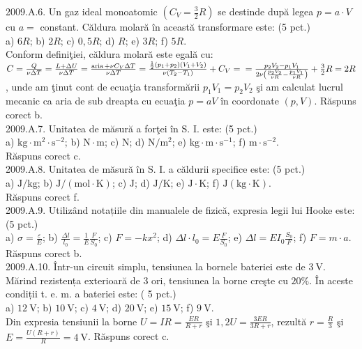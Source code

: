 2009.A.6. Un gaz ideal monoatomic $\left(C_{V}=\frac{3}{2} R\right)$ se destinde după legea $p=a \cdot V$ cu $a=$ constant. Căldura molară în această transformare este: (5 pct.)\\ a) $6 R$; b) $2 R$; c) $0,5 R$; d) $R$; e) $3 R$; f) $5 R$.\\ Conform definiţiei, căldura molară este egală cu:\\ $C=\frac{Q}{\nu \Delta T}=\frac{L+\Delta U}{\nu \Delta T}=\frac{\operatorname{aria}+\nu C_{V} \Delta T}{\nu \Delta T}=\frac{\frac{1}{2}\left(p_{1}+p_{2}\right)\left(V_{1}+V_{2}\right)}{\nu\left(T_{2}-T_{1}\right)}+C_{V}= \\ =\frac{p_{2} V_{2}-p_{1} V_{1}}{2 \nu\left(\frac{p_{2} V_{2}}{\nu R}-\frac{p_{1} V_{1}}{\nu R}\right)}+\frac{3}{2} R=2 R$, unde am ţinut cont de ecuaţia transformării $p_{1} V_{1}=p_{2} V_{2}$ şi am calculat lucrul mecanic ca aria de sub dreapta cu ecuaţia $p=a V$ în coordonate $(p, V)$. Răspuns corect b.\\

2009.A.7. Unitatea de măsură a forţei în S. I. este: (5 pct.)\\ a) $\mathrm{kg} \cdot \mathrm{m}^{2} \cdot \mathrm{s}^{-2}$; b) $\mathrm{N} \cdot \mathrm{m}$; c) $\mathrm{N}$; d) $\mathrm{N} / \mathrm{m}^{2}$; e) $\mathrm{kg} \cdot \mathrm{m} \cdot \mathrm{s}^{-1}$; f) $\mathrm{m} \cdot \mathrm{s}^{-2}$.\\ Răspuns corect c.\\

2009.A.8. Unitatea de măsură în S. I. a căldurii specifice este: (5 pct.)\\ a) $\mathrm{J} / \mathrm{kg}$; b) $\mathrm{J} /(\mathrm{mol} \cdot \mathrm{K})$; c) $\mathrm{J}$; d) $\mathrm{J} / \mathrm{K}$; e) $\mathrm{J} \cdot \mathrm{K}$; f) $\mathrm{J}(\mathrm{kg} \cdot \mathrm{K})$.\\ Răspuns corect f.\\

2009.A.9. Utilizând notațiile din manualele de fizică, expresia legii lui Hooke este: (5 pct.)\\ a) $\sigma=\frac{\varepsilon}{E}$; b) $\frac{\Delta l}{l_{0}}=\frac{1}{E} \frac{F}{S_{0}}$; c) $F=-k x^{2}$; d) $\Delta l \cdot l_{0}=E \frac{F}{S_{0}}$; e) $\Delta l=E I_{0} \frac{S_{0}}{F}$; f) $F=m \cdot a$. Răspuns corect b.\\

2009.A.10. Într-un circuit simplu, tensiunea la bornele bateriei este de $3 \mathrm{~V}$. Mărind rezistența exterioară de 3 ori, tensiunea la borne creşte cu $20 \%$. În aceste condiții t. e. m. a bateriei este: ( 5 pct.)\\ a) $12 \mathrm{~V}$; b) $10 \mathrm{~V}$; c) $4 \mathrm{~V}$; d) $20 \mathrm{~V}$; e) $15 \mathrm{~V}$; f) $9 \mathrm{~V}$.\\ Din expresia tensiunii la borne $U=I R=\frac{E R}{R+r}$ şi $1,2 U=\frac{3 E R}{3 R+r}$, rezultă $r=\frac{R}{3}$ şi $E=\frac{U(R+r)}{R}=4 \mathrm{~V}$. Răspuns corect c.\\

